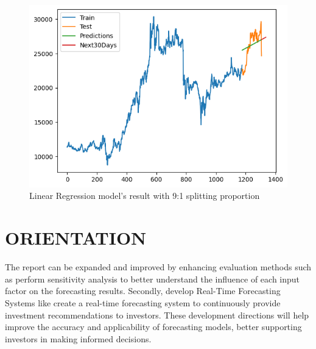 \documentclass{ieeeojies}
\begin{document}
\begin{figure}[H]
  \centering
  \begin{minipage}{0.6\linewidth}
    \centering
    \includegraphics[width=\linewidth]{bibliography/diagram/LR-ACB.png}
    \caption{Linear Regression model’s result with 9:1 splitting proportion}
    \label{fig8}
  \end{minipage}
\end{figure}




\section{ORIENTATION}
The report can be expanded and improved by enhancing evaluation methods such as  perform sensitivity analysis to better understand the influence of each input factor on the forecasting results. Secondly, develop Real-Time Forecasting Systems like create a real-time forecasting system to continuously provide investment recommendations to investors. These development directions will help improve the accuracy and applicability of forecasting models, better supporting investors in making informed decisions.
\end{document}
